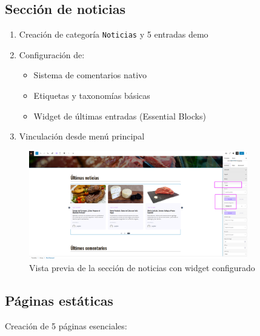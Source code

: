 \documentclass[a4paper]{article}
\begin{document}
\subsection{Sección de noticias}
\begin{enumerate}
    \item Creación de categoría \texttt{Noticias} y 5 entradas demo
    \item Configuración de:
    \begin{itemize}
        \item Sistema de comentarios nativo
        \item Etiquetas y taxonomías básicas
        \item Widget de últimas entradas (Essential Blocks)
    \end{itemize}
    \item Vinculación desde menú principal
\end{enumerate}

\begin{figure}[H]
    \centering
    \includegraphics[width=0.85\textwidth]{images/news-section.png}
    \caption{Vista previa de la sección de noticias con widget configurado}
\end{figure}


\subsection{Páginas estáticas}
Creación de 5 páginas esenciales:
\end{document}
